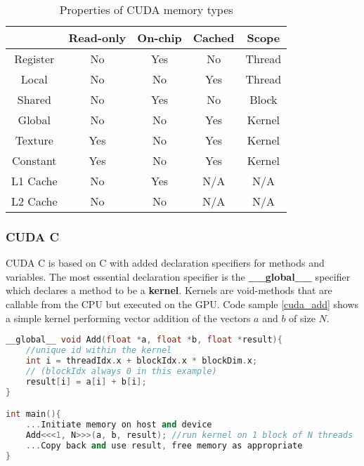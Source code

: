 \begin{table}[h!]
\centering
\begin{tabular}{ | c | c | c | c | c | }
  \hline
           & Read-only & On-chip   & Cached & Scope  \\ \hline
  Register & No        & Yes       & No     & Thread \\ \hline
  Local    & No        & No        & Yes    & Thread \\ \hline
  Shared   & No        & Yes       & No     & Block  \\ \hline
  Global   & No        & No        & Yes    & Kernel \\ \hline
  Texture  & Yes       & No        & Yes    & Kernel \\ \hline
  Constant & Yes       & No        & Yes    & Kernel \\ \hline
  L1 Cache & No        & Yes       & N/A    & N/A    \\ \hline
  L2 Cache & No        & No        & N/A    & N/A    \\ \hline

\end{tabular}
\caption{Properties of CUDA memory types\label{table:memorytypes}}
\end{table}

\subsubsection{CUDA C}
CUDA C is based on C with added declaration specifiers for methods and variables. 
The most essential declaration specifier is the \textbf{\_\_global\_\_} specifier which declares a method to be a \textbf{kernel}. 
Kernels are void-methods that are callable from the CPU but executed on the GPU. 
Code sample \ref{cuda_add} shows a simple kernel performing vector addition of the vectors $a$ and $b$ of size $N$.

\begin{lstlisting}[language=C++, caption=CUDA C addition kernel, label=cuda_add]
__global__ void Add(float *a, float *b, float *result){
	//unique id within the kernel
	int i = threadIdx.x + blockIdx.x * blockDim.x;
	// (blockIdx always 0 in this example)
	result[i] = a[i] + b[i];
}

int main(){
	...Initiate memory on host and device
	Add<<<1, N>>>(a, b, result); //run kernel on 1 block of N threads
	...Copy back and use result, free memory as appropriate
}
\end{lstlisting}

